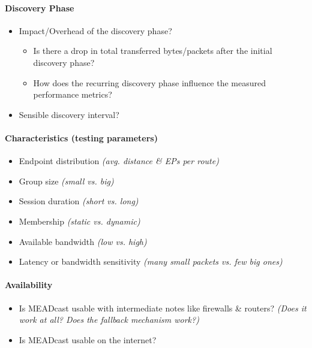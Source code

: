 \paragraph{Discovery Phase} %
\label{par:Discovery Phase}
\begin{itemize}
    \item Impact/Overhead of the discovery phase?
    \begin{itemize}
        \item Is there a drop in total transferred bytes/packets after the
            initial discovery phase?
        \item How does the recurring discovery phase influence the measured
            performance metrics?
    \end{itemize}
    \item Sensible discovery interval?
\end{itemize}

\paragraph{Characteristics (testing parameters)} %
\label{par:Characteristics}
\begin{itemize}
    \item Endpoint distribution \textit{(avg. distance \& EPs per route)}
    \item Group size \textit{(small vs. big)}
    \item Session duration \textit{(short vs. long)}
    \item Membership \textit{(static vs. dynamic)}
    \item Available bandwidth \textit{(low vs. high)}
    \item Latency or bandwidth sensitivity
        \textit{(many small packets vs. few big ones)}
\end{itemize}

\paragraph{Availability} %
\label{par:Availability}
\begin{itemize}
    \item Is MEADcast usable with intermediate notes like firewalls \& routers?
        \textit{(Does it work at all? Does the fallback mechanism work?)}
    \item Is MEADcast usable on the internet?
\end{itemize}

